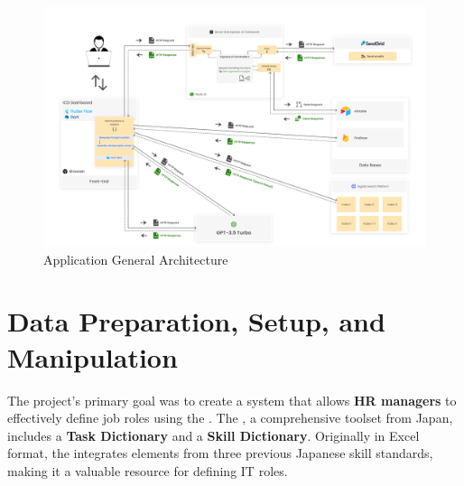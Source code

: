 \begin{landscape}
    \begin{figure}
        \centering
        \includegraphics[width=0.95\linewidth]{src/assets/images/ICD-Application-Global-Architecture-Final-Edition.jpg}
        \caption{Application General Architecture}
        \label{fig:GeneralArchitecture}
    \end{figure}
\end{landscape}



\section{Data Preparation, Setup, and Manipulation}
The project's primary goal was to create a system that allows {\color{newBlue}\textbf{HR managers}} to effectively define job roles using the . The , a comprehensive toolset from Japan, includes a {\color{darkPurple}\textbf{Task Dictionary}} and a {\color{darkPurple}\textbf{Skill Dictionary}}. Originally in Excel format, the  integrates elements from three previous Japanese skill standards, making it a valuable resource for defining IT roles.


